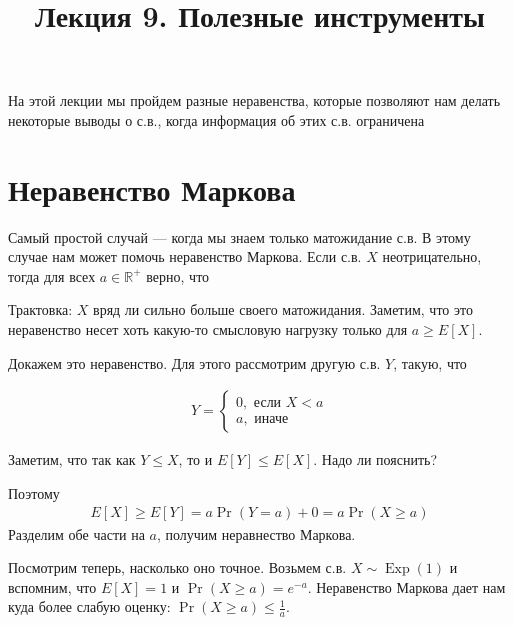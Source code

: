 \documentclass[12pt]{article}
\title{Лекция 9. Полезные инструменты}
\newcommand\R{\mathbb{R}}
\DeclareMathOperator{\Exp}{Exp}
\begin{document}
\maketitle

На этой лекции мы пройдем разные неравенства, которые позволяют нам делать некоторые выводы о с.в., когда информация об этих с.в. ограничена

\section{Неравенство Маркова}

Самый простой случай --- когда мы знаем только матожидание с.в. В этому случае нам может помочь неравенство Маркова. Если с.в. $X$ неотрицательно, тогда для всех $a \in \R^+$ верно, что 

\begin{center}
\end{center}

Трактовка: $X$ вряд ли сильно больше своего матожидания. Заметим, что это неравенство несет хоть какую-то смысловую нагрузку только для $a \ge E[X]$.

Докажем это неравенство. Для этого рассмотрим другую с.в. $Y$, такую, что

\begin{align*}
  Y = \begin{cases}
    0, \text{ если } X < a \\
    a, \text{ иначе}
  \end{cases}
\end{align*}

Заметим, что так как $Y \le X$, то и $E[Y] \le E[X]$. Надо ли пояснить?

Поэтому
\begin{align*}
  E[X] \ge E[Y] = a\Pr(Y = a) + 0 = a\Pr(X \ge a)
\end{align*}
Разделим обе части на $a$, получим неравнество Маркова.

Посмотрим теперь, насколько оно точное. Возьмем с.в. $X \sim \Exp(1)$ и вспомним, что $E[X] = 1$ и $\Pr(X \ge a) = e^{-a}$.
Неравенство Маркова дает нам куда более слабую оценку: $\Pr(X \ge a) \le \frac{1}{a}$.
\end{document}
